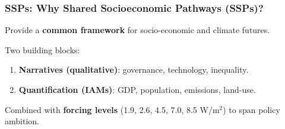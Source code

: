 \documentclass[xcolor=x11names,compress,aspectratio=169]{beamer}%
\makeatletter
\renewenvironment{itemize}{\begin{compactitemize}[<+-| alert@+>]}{\end{compactitemize}}
\makeatother
\begin{document}
\begin{frame}%
%

\frametitle{SSPs: Why Shared Socioeconomic Pathways (SSPs)?}%


\begin{itemize}
\item Provide a \textbf{common framework} for socio-economic and climate
futures.%
\vspace{2ex}%


\item Two building blocks:%
\vspace{1ex}%


\begin{enumerate}
\item \textbf{Narratives (qualitative)}: governance, technology, inequality.%
\vspace{1ex}%


\item \textbf{Quantification (IAMs)}: GDP, population, emissions, land-use.%
\vspace{2ex}%

\end{enumerate}

\item Combined with \textbf{forcing levels} (1.9, 2.6, 4.5, 7.0, 8.5 W/m$^{2}%
$) to span policy ambition.
\end{itemize}

%

\transboxout
\end{frame}%
%
\end{document}

